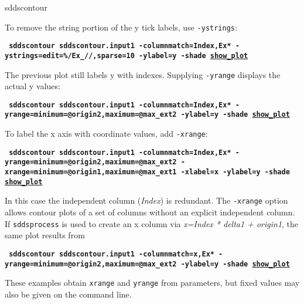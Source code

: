 \begin{sddsprog}{sddscontour}
\begin{itemize}
        To remove the string portion of the y tick labels, use \verb|-ystrings|:
        \begin{flushleft}{\tt \bf
            sddscontour sddscontour.input1 -columnmatch=Index,Ex* -ystrings=edit=\%/Ex_//,sparse=10 -ylabel=y -shade
            \href{https://ops.aps.anl.gov/manuals/example_files/sddscontour2_img.html}{show\_plot}
        }\end{flushleft}

        The previous plot still labels y with indexes.  Supplying \verb|-yrange| displays the actual y values:
        \begin{flushleft}{\tt \bf
            sddscontour sddscontour.input1 -columnmatch=Index,Ex* -yrange=minimum=@origin2,maximum=@max\_ext2 -ylabel=y -shade
            \href{https://ops.aps.anl.gov/manuals/example_files/sddscontour3_img.html}{show\_plot}
        }\end{flushleft}

        To label the x axis with coordinate values, add \verb|-xrange|:
        \begin{flushleft}{\tt \bf
            sddscontour sddscontour.input1 -columnmatch=Index,Ex* -yrange=minimum=@origin2,maximum=@max\_ext2 -xrange=minimum=@origin1,maximum=@max\_ext1 -xlabel=x -ylabel=y -shade \href{https://ops.aps.anl.gov/manuals/example_files/sddscontour4_img.html}{show\_plot}
        }\end{flushleft}

        In this case the independent column ({\em Index}) is redundant.  The \verb|-xrange| option allows contour plots of a set
        of columns without an explicit independent column.  If \verb|sddsprocess| is used to create an x column via
        {\em x=Index * delta1 + origin1}, the same plot results from
        \begin{flushleft}{\tt \bf
            sddscontour sddscontour.input1 -columnmatch=x,Ex* -yrange=minimum=@origin2,maximum=@max\_ext2 -ylabel=y -shade \href{https://ops.aps.anl.gov/manuals/example_files/sddscontour5_img.html}{show\_plot}
        }\end{flushleft}

        These examples obtain \verb|xrange| and \verb|yrange| from parameters, but fixed values may also be given on the command line.



\end{itemize}
\end{sddsprog}

